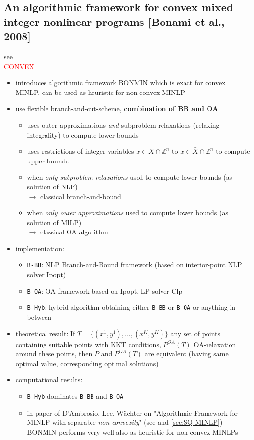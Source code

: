 \documentclass{article}
\begin{document}
\subsection{An algorithmic framework for convex mixed integer nonlinear programs [Bonami et al., 2008]}
see \cite{bonami2008algorithmic}\\
\textcolor{red}{CONVEX}
\begin{itemize}
\item introduces algorithmic framework BONMIN which is exact for convex MINLP, can be used as heuristic for non-convex MINLP
\item use flexible branch-and-cut-scheme, \textbf{combination of BB and OA}
	\begin{itemize}
	\item uses outer approximations \textit{and} subproblem relaxations (relaxing integrality) to compute lower bounds
	\item uses restrictions of integer variables $x\in X \cap \mathbb{Z}^n$ to $x\in \bar{X} \cap \mathbb{Z}^n$ to compute upper bounds
	\item when \emph{only subproblem relaxations} used to compute lower bounds (as solution of NLP) \\
	$\rightarrow$ classical branch-and-bound
	\item when \textit{only outer approximations} used to compute lower bounds (as solution of MILP) \\
	$\rightarrow$ classical OA algorithm
	\end{itemize}
\item implementation:
	\begin{itemize}
	\item \texttt{B-BB}: NLP Branch-and-Bound framework (based on interior-point NLP solver Ipopt)
	\item \texttt{B-OA}: OA framework based on Ipopt, LP solver Clp
	\item \texttt{B-Hyb}: hybrid algorithm obtaining either \texttt{B-BB} or \texttt{B-OA} or anything in between
	\end{itemize}
\item theoretical result: If $T=\{(x^1,y^1), ... ,(x^K,y^K)\}$ any set of points containing suitable points with KKT conditions, $P^{OA}(T)$ OA-relaxation around these points, then $P$ and $P^{OA}(T)$ are equivalent (having same optimal value, corresponding optimal solutions)
\item computational results:
	\begin{itemize}
	\item  \texttt{B-Hyb} dominates \texttt{B-BB} and \texttt{B-OA}
	\item in paper of D'Ambrosio, Lee, W\"achter on "Algorithmic Framework for MINLP with separable \emph{non-convexity}" (see \cite{d2012algorithmic} and \ref{sec:SQ-MINLP}) BONMIN performs very well also as heuristic for non-convex MINLPs
	\end{itemize}
\end{itemize}
\end{document}
